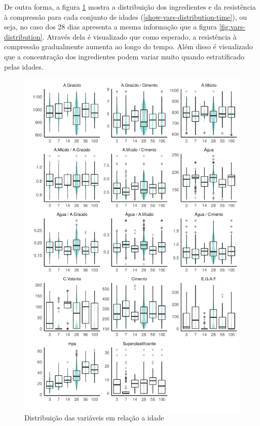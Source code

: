 \documentclass[]{article}
\begin{document}
De outra forma, a figura \ref{fig:vars-distribution-time} mostra a
distribuição dos ingredientes e da resistência à compressão para cada
conjunto de idades (\ref{show-vars-distribution-time}), ou seja, no caso
dos 28 dias apresenta a mesma informação que a figura
\ref{fig:vars-distribution}. Através dela é visualizado que como
esperado, a resistência à compressão gradualmente aumenta ao longo do
tempo. Além disso é visualizado que a concentração dos ingredientes
podem variar muito quando estratíficado pelas idades.

\begin{figure}

{\centering \includegraphics{paper_PT_files/figure-latex/vars-distribution-time-1} 

}

\caption{Distribuição das variáveis em relação a idade}\label{fig:vars-distribution-time}
\end{figure}
\end{document}
